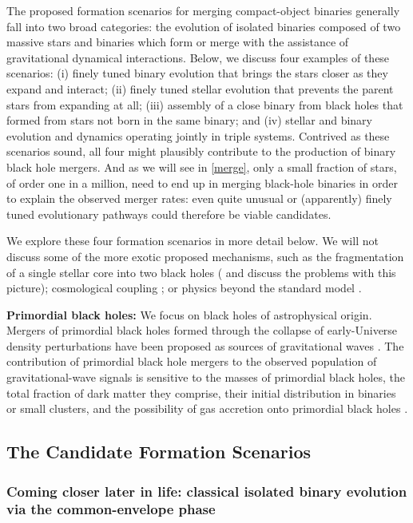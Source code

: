 \documentclass[review]{elsarticle}
\begin{document}
The proposed formation scenarios for merging compact-object binaries generally fall into two broad categories: the evolution of isolated binaries composed of two massive stars and binaries which form or merge with the assistance of gravitational dynamical interactions.  Below, we discuss four examples of these scenarios: (i) finely tuned binary evolution that brings the stars closer as they expand and interact; (ii) finely tuned stellar evolution that prevents the parent stars from expanding at all; (iii) assembly of a close binary from black holes that formed from stars not born in the same binary; and (iv) stellar and binary evolution and dynamics operating jointly in triple systems.   Contrived as these scenarios sound, all four might plausibly contribute to the production of binary black hole mergers.  And as we will see in \autoref{merge}, only a small fraction of stars, of order one in a million, need to end up in merging black-hole binaries in order to explain the observed merger rates: even quite unusual or (apparently) finely tuned evolutionary pathways could therefore be viable candidates.

We explore these four formation scenarios in more detail below. We will not discuss some of the more exotic proposed mechanisms, such as the fragmentation of a single stellar core into two black holes \citep{Loeb:2016} (\citet{Woosley:2016} and \citet{Dai:2017} discuss the problems with this picture); cosmological coupling \citep{Croker:2021}; or physics beyond the standard model \citep{Sakstein:2020}. 

\textbf{Primordial black holes:}  We focus on black holes of astrophysical origin.   Mergers of primordial black holes formed through the collapse of early-Universe density perturbations have been proposed as sources of gravitational waves \citep{Bird:2016}.   The contribution of primordial black hole mergers to the observed population of gravitational-wave signals is sensitive to the masses of primordial black holes, the total fraction of dark matter they comprise, their initial distribution in binaries or small clusters, and the possibility of gas accretion onto primordial black holes \citep{AliHaimoud:2017, ChenHuang:2018, Korol:2019, DeLuca:2020b, DeLuca:2020a}.

\subsection{The Candidate Formation Scenarios}
\subsubsection{Coming closer later in life: classical isolated binary evolution via the common-envelope phase}
\label{form:isol}
\end{document}
